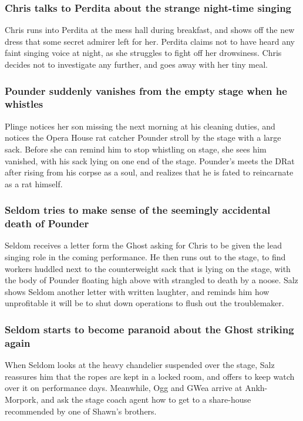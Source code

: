 \subsubsection{\Gls{Chris} talks to \Gls{Perdita} about the strange night-time singing}
\Gls{Chris} runs into \Gls{Perdita} at the mess hall during breakfast, and shows off the new dress
that some secret admirer left for her. \Gls{Perdita} claims not to have heard any faint singing
voice at night, as she struggles to fight off her drowsiness. \Gls{Chris} decides not to investigate
any further, and goes away with her tiny meal.

\subsubsection{\Gls{Pounder} suddenly vanishes from the empty stage when he whistles}
\Gls{Plinge} notices her son missing the next morning at his cleaning duties, and notices the
Opera House rat catcher \Gls{Pounder} stroll by the stage with a large sack. Before she can remind
him to stop whistling on stage, she sees him vanished, with his sack lying on one end of the stage.
\Gls{Pounder}'s meets the \Gls{DRat} after rising from his corpse as a soul, and realizes that he
is fated to reincarnate as a rat himself.

\subsubsection{\Gls{Seldom} tries to make sense of the seemingly accidental death of \Gls{Pounder}}
\Gls{Seldom} receives a letter form the \Gls{Ghost} asking for \Gls{Chris} to be given the lead
singing role in the coming performance. He then runs out to the stage, to find workers huddled
next to the counterweight sack that is lying on the stage, with the body of \Gls{Pounder} floating
high above with strangled to death by a noose. \Gls{Salz} shows \Gls{Seldom} another letter with
written laughter, and reminds him how unprofitable it will be to shut down operations to flush out
the troublemaker.

\subsubsection{\Gls{Seldom} starts to become paranoid about the \Gls{Ghost} striking again}
When \Gls{Seldom} looks at the heavy chandelier suspended over the stage, \Gls{Salz} reassures him
that the ropes are kept in a locked room, and offers to keep watch over it on performance days.
Meanwhile, \Gls{Ogg} and \Gls{GWea} arrive at Ankh-Morpork, and ask the stage coach agent how to
get to a share-house recommended by one of \Gls{Shawn}'s brothers.

